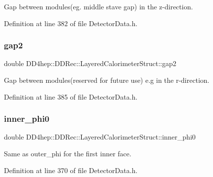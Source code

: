 Gap between modules(eg. middle stave gap) in the z-\/direction. 



Definition at line 382 of file Detector\+Data.\+h.

\hypertarget{struct_d_d4hep_1_1_d_d_rec_1_1_layered_calorimeter_struct_a72a13e8a8f2a42bdf6b5fa2e5bfad10d}{}\label{struct_d_d4hep_1_1_d_d_rec_1_1_layered_calorimeter_struct_a72a13e8a8f2a42bdf6b5fa2e5bfad10d} 
\subsubsection{\texorpdfstring{gap2}{gap2}}
{\footnotesize\ttfamily double D\+D4hep\+::\+D\+D\+Rec\+::\+Layered\+Calorimeter\+Struct\+::gap2}



Gap between modules(reserved for future use) e.\+g in the r-\/direction. 



Definition at line 385 of file Detector\+Data.\+h.

\hypertarget{struct_d_d4hep_1_1_d_d_rec_1_1_layered_calorimeter_struct_a5ea761ee743ac216f442d91f97d82516}{}\label{struct_d_d4hep_1_1_d_d_rec_1_1_layered_calorimeter_struct_a5ea761ee743ac216f442d91f97d82516} 
\subsubsection{\texorpdfstring{inner\+\_\+phi0}{inner\_phi0}}
{\footnotesize\ttfamily double D\+D4hep\+::\+D\+D\+Rec\+::\+Layered\+Calorimeter\+Struct\+::inner\+\_\+phi0}

Same as outer\+\_\+phi for the first inner face. 

Definition at line 370 of file Detector\+Data.\+h.

\hypertarget{struct_d_d4hep_1_1_d_d_rec_1_1_layered_calorimeter_struct_a94ead288a528b23775bde06ccfd00e99}{}\label{struct_d_d4hep_1_1_d_d_rec_1_1_layered_calorimeter_struct_a94ead288a528b23775bde06ccfd00e99} 
